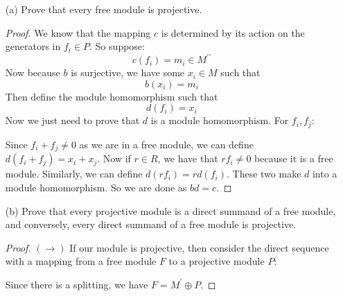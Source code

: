 \documentclass{article}
\begin{document}
\begin{itemize}
    \item [(a)] Prove that every free module is projective.
        \begin{proof}
            We know that the mapping $c$ is determined by its action on the generators in $f_{i} \in P$. So suppose:
                \begin{equation*}
                    c(f_{i}) = m_{i} \in M^{\prime\prime}
                \end{equation*}
            Now because $b$ is surjective, we have some $x_{i} \in M$ such that
                \begin{equation*}
                    b(x_{i}) = m_{i}
                \end{equation*}
            Then define the module homomorphism such that
                \begin{equation*}
                    d(f_{i}) = x_{i}
                \end{equation*}
            Now we just need to prove that $d$ is a module homomorphism. For $f_{i}, f_{j}$:
                \begin{center}
                \end{center}
            Since $f_{i} + f_{j} \neq 0$ as we are in a free module, we can define $d(f_{i} + f_{j}) = x_{i} + x_{j}$. Now if $r \in R$, we have that $rf_{i} \neq 0$ because it is a free module. Similarly, we can define $d(rf_{i}) = rd(f_{i})$. These two make $d$ into a module homomorphism. So we are done as $bd = c$.
        \end{proof}

    \item [(b)] Prove that every projective module is a direct summand of a free module, and conversely, every direct summand of a free module is projective. 
        \begin{proof}
            $(\rightarrow )$ If our module is projective, then consider the direct sequence with a mapping from a free module $F$ to a projective module $P$:
                \begin{center}
                \end{center}
            Since there is a splitting, we have $F = M^{\prime} \oplus P$.


\end{proof}
\end{itemize}
\end{document}
